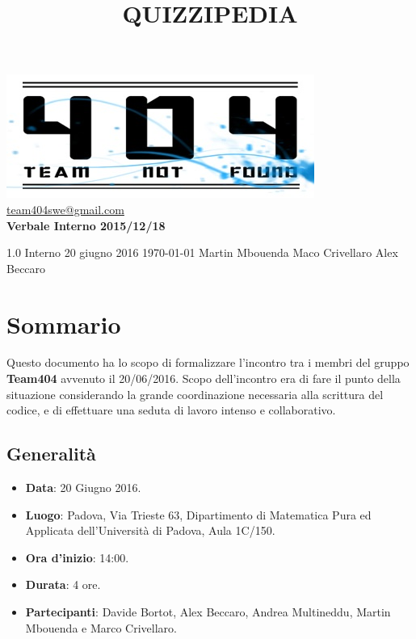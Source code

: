 \documentclass[a4paper,11pt]{article}
\title{\textbf{{\fontsize{10mm}{6mm}\selectfont QUIZZIPEDIA}}}
\begin{document}
	\maketitle
	
	\begin{center}

	\includegraphics{../../../team_not_found.jpg}\\	
	\fontsize{5mm}{3mm}\url{team404swe@gmail.com}\\
	\vspace{40mm}
	\textbf{ Verbale Interno 2015/12/18 }
	\end{center}
	\thispagestyle{empty}	%
			{1.0} 							%
			{Interno} 						%
			{20 giugno 2016} 				%
			{\today} 						%
			{Martin Mbouenda}				%
			{Maco Crivellaro} 			%
			{Alex Beccaro} 				%
	 
	\newpage
	\section{Sommario}
	Questo documento ha lo scopo di formalizzare l'incontro tra i membri del gruppo \textbf{Team404} avvenuto il 20/06/2016. Scopo dell'incontro era di fare il punto della situazione considerando la grande coordinazione necessaria alla scrittura del codice, e di effettuare una seduta di lavoro intenso e collaborativo. 
	\subsection{Generalità}
	\begin{itemize}
	\item\textbf{Data}: 20 Giugno 2016.
	\item\textbf{Luogo}: Padova, Via Trieste 63, Dipartimento di Matematica Pura ed Applicata dell'Università di Padova, Aula 1C/150.
	\item\textbf{Ora d'inizio}: 14:00.
	\item\textbf{Durata}: 4 ore.
	\item\textbf{Partecipanti}: Davide Bortot, Alex Beccaro, Andrea Multineddu, Martin  Mbouenda e Marco Crivellaro.
	\end{itemize}
\end{document}
